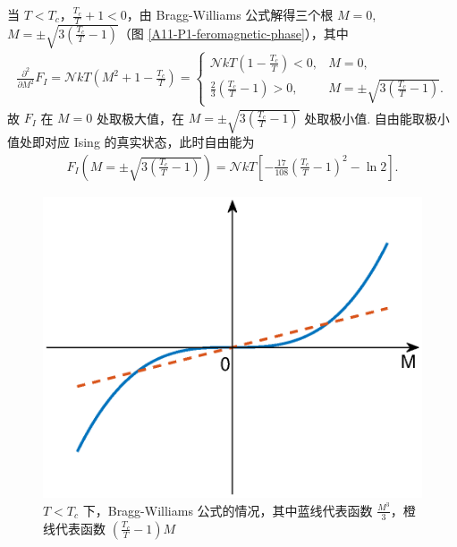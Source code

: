 \documentclass{assignment}
\begin{document}
\begin{sol}
    当 $T<T_c$，$\frac{T_c}{T}+1<0$，由 Bragg-Williams 公式解得三个根 $M=0$, $M=\pm\sqrt{3\left(\frac{T_c}{T}-1\right)}$（图 \eqref{A11-P1-feromagnetic-phase}），其中
    \begin{align}
        \frac{\partial^2}{\partial M^2}F_I=\mathcal{N}kT\left(M^2+1-\frac{T_c}{T}\right)=\left\{\begin{array}{ll}
            \mathcal{N}kT\left(1-\frac{T_c}{T}\right)<0,&M=0,\\
            \frac{2}{3}\left(\frac{T_c}{T}-1\right)>0,&M=\pm\sqrt{3\left(\frac{T_c}{T}-1\right)}.
        \end{array}\right.
    \end{align}
    故 $F_I$ 在 $M=0$ 处取极大值，在 $M=\pm\sqrt{3\left(\frac{T_c}{T}-1\right)}$ 处取极小值. 自由能取极小值处即对应 Ising 的真实状态，此时自由能为
    \begin{align}
        F_I\left(M=\pm\sqrt{3\left(\frac{T_c}{T}-1\right)}\right)=\mathcal{N}kT\left[-\frac{17}{108}\left(\frac{T_c}{T}-1\right)^2-\ln 2\right].
    \end{align}
    \begin{figure}[H]
        \centering
        \includegraphics[width=.4\columnwidth]{A11-P1-feromagnetic-phase.eps}
        \caption{$T<T_c$ 下，Bragg-Williams 公式的情况，其中蓝线代表函数 $\frac{M^3}{3}$，橙线代表函数 $\left(\frac{T_c}{T}-1\right)M$}
    \end{figure}
\end{sol}
\end{document}
